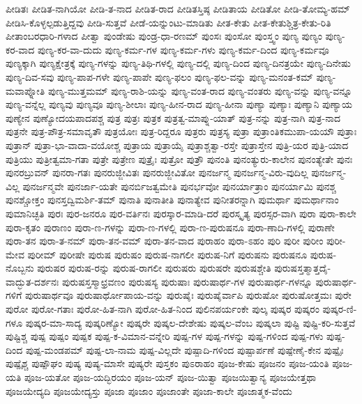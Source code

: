 {ಪೀಡಿತಃ
ಪೀಡಿತ-ನಾಗಿಯೋ
ಪೀಡಿ-ತ-ನಾದ
ಪೀಡಿತ-ರಾದ
ಪೀಡಿತಸ್ತಿಷ್ಠ
ಪೀಡಿತಾಯ
ಪೀಡಿತೋ
ಪೀಡಿ-ತೋಮ್ಯ-ಹಮ್
ಪೀಡಿಸಿ-ಕೊಳ್ಳಲ್ಪಡುತ್ತಿದ್ದವು
ಪೀಡಿ-ಸುತ್ತವೆ
ಪೀಡೆ-ಯನ್ನುಂಟು-ಮಾಡಿತು
ಪೀತ-ಕೇತು
ಪೀತ-ಕೇತುಶ್ಚಿತ್ರ-ಕೇತು-ರಿತಿ
ಪೀತಾಂಬರಧಾರಿ-ಗಳಾದ
ಪೀತ್ವಾ
ಪುಂಡೇಷು
ಪುಂಡ್ರ-ಧಾ-ರಣಮ್
ಪುಂಸಃ
ಪುಂಸೋ
ಪುಂಸ್ತ್ವಂ
ಪುಣ್ಯ
ಪುಣ್ಯಂ
ಪುಣ್ಯ-ಕರ-ವಾದ
ಪುಣ್ಯ-ಕರ-ವಾ-ದುದು
ಪುಣ್ಯ-ಕರ್ಮ-ಗಳ
ಪುಣ್ಯ-ಕರ್ಮ-ಗಳು
ಪುಣ್ಯ-ಕರ್ಮ-ದಿಂದ
ಪುಣ್ಯ-ಕರ್ಮವೂ
ಪುಣ್ಯಕ್ಕಾಗಿ
ಪುಣ್ಯಕ್ಷೇತ್ರಕ್ಕೆ
ಪುಣ್ಯ-ಗಳನ್ನು
ಪುಣ್ಯ-ತಿಥಿ-ಗಳಲ್ಲಿ
ಪುಣ್ಯ-ದಲ್ಲಿ
ಪುಣ್ಯ-ದಿಂದ
ಪುಣ್ಯ-ದಿನತ್ರಯೇ
ಪುಣ್ಯ-ದಿನೇಷು
ಪುಣ್ಯ-ದಿವ-ಸವು
ಪುಣ್ಯ-ಪಾಪ-ಗಳೇ
ಪುಣ್ಯ-ಪಾಪೇ
ಪುಣ್ಯ-ಫಲಂ
ಪುಣ್ಯ-ಫಲ-ವನ್ನು
ಪುಣ್ಯ-ಮನಂತ-ಕಮ್
ಪುಣ್ಯ-ಮವಾಪ್ನೋತಿ
ಪುಣ್ಯ-ಮುತ್ತಮಮ್
ಪುಣ್ಯ-ರಾಶಿ-ಯನ್ನು
ಪುಣ್ಯ-ವಂತ-ರಾದ
ಪುಣ್ಯ-ವಂತರು
ಪುಣ್ಯ-ವನ್ನು
ಪುಣ್ಯ-ವನ್ನೂ
ಪುಣ್ಯ-ವನ್ನೆಲ್ಲ
ಪುಣ್ಯವು
ಪುಣ್ಯವೂ
ಪುಣ್ಯ-ಶೀಲಾಃ
ಪುಣ್ಯ-ಹೀನ-ರಾದ
ಪುಣ್ಯ-ಹೀನಾ
ಪುಣ್ಯಾ
ಪುಣ್ಯಾಃ
ಪುಣ್ಯಾನಿ
ಪುಣ್ಯಾಯ
ಪುಣ್ಯೇನ
ಪುಣ್ಯೋದಯಪಾದಪಶ್ಚ
ಪುತ್ರ
ಪುತ್ರಃ
ಪುತ್ರಕ
ಪುತ್ರತ್ವ-ಮಾಪ್ನು-ಯಾತ್
ಪುತ್ರ-ನನ್ನು
ಪುತ್ರ-ನಾಗಿ
ಪುತ್ರ-ನಾದ
ಪುತ್ರನೇ
ಪುತ್ರ-ಪೌತ್ರ-ಸಮಾವೃತೌ
ಪುತ್ರಯೋಃ
ಪುತ್ರ-ರಿದ್ದರೂ
ಪುತ್ರರು
ಪುತ್ರಸ್ಯ
ಪುತ್ರಾ
ಪುತ್ರಾಂತಿಕಮುಪಾ-ಯಯೌ
ಪುತ್ರಾಃ
ಪುತ್ರಾನ್
ಪುತ್ರಾ-ಭಾ-ವಾದಾ-ವಯೋಶ್ಚ
ಪುತ್ರಾಯ
ಪುತ್ರಾಯೈ
ಪುತ್ರಾಶ್ಚತ್ವಾ-ರಸ್ತೇ
ಪುತ್ರಾಸ್ತೇನ
ಪುತ್ರಿ-ಯರ
ಪುತ್ರಿ-ಯಾದ
ಪುತ್ರಿಯು
ಪುತ್ರೀತ್ವಮಾ-ಗತಾ
ಪುತ್ರೇ
ಪುತ್ರೇಣ
ಪುತ್ರೈಃ
ಪುತ್ರೋ
ಪುತ್ರೌ
ಪುನಂತಿ
ಪುನಂತ್ಯುರು-ಕಾಲೇನ
ಪುನಂತ್ಯೇತೇ
ಪುನಃ
ಪುನರಬ್ರುವನ್
ಪುನರಾ-ಗತಃ
ಪುನರುಜ್ಜೀವಿತಃ
ಪುನರುಜ್ಜೀವಿತೋ
ಪುನರ್ಜನ್ಮ
ಪುನರ್ಜನ್ಮ-ವಿರು-ವುದಿಲ್ಲ
ಪುನರ್ಜನ್ಮ-ವಿಲ್ಲ
ಪುನರ್ಜನ್ಮವೇ
ಪುನರ್ಜಾ-ಯತೇ
ಪುನರ್ಬಿಜತ್ವಮೇತಿ
ಪುನರ್ಭವೋ
ಪುನರ್ಯಾತ್ರಾಂ
ಪುನರ್ಯಾಮಿ
ಪುನಶ್ಚ
ಪುನಶ್ಚೋಕ್ತಂ
ಪುನಸ್ತದ್ವಿಮರ್ಶಿ-ತಮ್
ಪುನಾತಿ
ಪುನಾತೀತಿ
ಪುನಾತ್ಯೇವ
ಪುನೀತರನ್ನಾಗಿ
ಪುಮರ್ಥಾ
ಪುಮರ್ಥಾನಾಂ
ಪುಮಾನಿಚ್ಛತಿ
ಪುರಃ
ಪುರ-ಜನರೂ
ಪುರ-ವರ್ತಿನಃ
ಪುರಸ್ಕಾರ-ಮಾಡಿ-ದರೆ
ಪುರಸ್ಕೃತ್ಯ
ಪುರಸ್ಸರ-ವಾಗಿ
ಪುರಾ
ಪುರಾ-ಕಾಲೇ
ಪುರಾ-ಕೃತಂ
ಪುರಾಣಂ
ಪುರಾ-ಣ-ಗಳನ್ನು
ಪುರಾ-ಣ-ಗಳಲ್ಲಿ
ಪುರಾ-ಣ-ಪುರುಷನೂ
ಪುರಾ-ಣಾದಿ-ಗಳಲ್ಲಿ
ಪುರಾಣೇ
ಪುರಾ-ತನ
ಪುರಾ-ತ-ನಮ್
ಪುರಾ-ತನ-ವಮ್
ಪುರಾ-ತನ-ವಾದ
ಪುರಾಹಂ
ಪುರಾ-ಽಹಂ
ಪುರಿ
ಪುರೀ
ಪುರೀಂ
ಪುರೀ-ಮೇವ
ಪುರೀಮ್
ಪುರೀಷೇ
ಪುರುಷ
ಪುರುಷಂ
ಪುರುಷ-ನಾಗಲೀ
ಪುರುಷ-ನಿಗೆ
ಪುರುಷನು
ಪುರುಷನೂ
ಪುರುಷ-ನೊಬ್ಬನು
ಪುರುಷರ
ಪುರುಷ-ರನ್ನು
ಪುರುಷ-ರಾಗಲೀ
ಪುರುಷರು
ಪುರುಷರೇ
ಪುರುಷಶ್ಚೇತಿ
ಪುರುಷಸ್ತತ್ಮಾತ್ತದೈ-ವಾದ್ಭುತ-ದರ್ಶನಃ
ಪುರುಷಸ್ತಸ್ಮಾಛ್ರವಣಂ
ಪುರುಷಸ್ಯ
ಪುರುಷಾಃ
ಪುರುಷಾರ್ಥ-ಗಳ
ಪುರುಷಾರ್ಥ-ಗಳನ್ನೂ
ಪುರುಷಾರ್ಥ-ಗಳಿಗೆ
ಪುರುಷಾರ್ಥವೂ
ಪುರುಷಾರ್ಥೋಪಾಯ-ವನ್ನು
ಪುರುಷೈಃ
ಪುರುಷೈರ್ವಾಪಿ
ಪುರುಷೋ
ಪುರುಷೋತ್ತಮಃ
ಪುರೇ
ಪುರೋ
ಪುರೋ-ಗತಾಃ
ಪುರೋ-ಹಿತ-ನಾಗಿ
ಪುರೋ-ಹಿತ-ನಿಂದ
ಪುಲಿನಪರ್ಯಂಕೇ
ಪುಲ್ಕ
ಪುಷ್ಕರ
ಪುಷ್ಕರಂ
ಪುಷ್ಕರ-ಣಿ-ಗಳೂ
ಪುಷ್ಕರ-ಮಾ-ಸಾದ್ಯ
ಪುಷ್ಕರಿಣ್ಯೋ
ಪುಷ್ಕರೇ
ಪುಷ್ಕಲ-ದೇಶೇಷು
ಪುಷ್ಕಲ-ವೆಂಬ
ಪುಷ್ಕಲಾ
ಪುಷ್ಟಿ
ಪುಷ್ಟಿ-ಕರಿ-ಸುತ್ತವೆ
ಪುಷ್ಟಿಶ್ಚ
ಪುಷ್ಪ
ಪುಷ್ಪಂ
ಪುಷ್ಪಕ
ಪುಷ್ಪ-ಕ-ವಿಮಾನ-ವನ್ನೇರಿ
ಪುಷ್ಪ-ಗಳ
ಪುಷ್ಪ-ಗಳನ್ನು
ಪುಷ್ಪ-ಗಳಿಂದ
ಪುಷ್ಪ-ಗಳು
ಪುಷ್ಪ-ದಿಂದ
ಪುಷ್ಪ-ಮಂಡಪಮ್
ಪುಷ್ಪ-ಲಾ-ನಾಮ
ಪುಷ್ಪ-ವಿಲ್ಲದೇ
ಪುಷ್ಪಾದಿ-ಗಳಿಂದ
ಪುಷ್ಪಾರ್ಪಣೆ
ಪುಷ್ಪೇಣೈ-ಕೇನ
ಪುಷ್ಪೈಃ
ಪುಷ್ಪೈಶ್ಚ
ಪುಷ್ಪೌಘಂ
ಪುಷ್ಯ
ಪುಷ್ಯ-ಮಾಸೇ
ಪುಷ್ಯರೇ
ಪುಸ್ತಕಂ
ಪುಽರಾಹಂ
ಪೂಜ-ಕೇಷು
ಪೂಜನಂ
ಪೂಜ-ಯಂತಿ
ಪೂಜ-ಯತಿ
ಪೂಜ-ಯತೋ
ಪೂಜ-ಯದ್ಭಿರಯಂ
ಪೂಜ-ಯನ್
ಪೂಜ-ಯಿತ್ವಾ
ಪೂಜಯಿತ್ವಾನ್ಯ
ಪೂಜಯೇತ್ತಥಾ
ಪೂಜಯೇದ್ಯದಿ
ಪೂಜಯೇದ್ಯಸ್ತು
ಪೂಜಾ
ಪೂಜಾಂ
ಪೂಜಾಂತೇ
ಪೂಜಾ-ಕಾಲೇ
ಪೂಜಾತ್ಮಕ-ವೆಂದು
}
